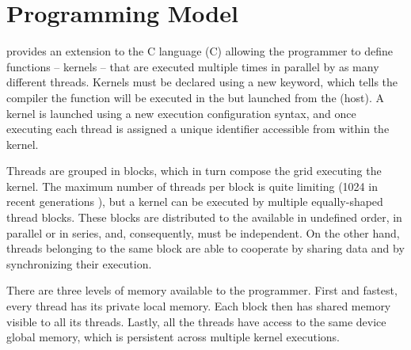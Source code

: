 \documentclass[../thesis]{subfiles}
\begin{document}
	\section{Programming Model}
	\label{sec:cuda:model}
	
	\cuda provides an extension to the C language (\cuda C) allowing the programmer to define functions -- kernels -- that are executed multiple times in parallel by as many different \cuda threads. Kernels must be declared using a new keyword, which tells the compiler the function will be executed in the \gpu but launched from the \cpu (host). A kernel is launched using a new execution configuration syntax, and once executing each thread is assigned a unique identifier accessible from within the kernel.


	Threads are grouped in blocks, which in turn compose the grid executing the kernel. The maximum number of threads per block is quite limiting (1024 in recent generations \cite{NVIDIA:KEPLER}), but a kernel can be executed by multiple equally-shaped thread blocks. These blocks are distributed to the available \sms in undefined order, in parallel or in series, and, consequently, must be independent. On the other hand, threads belonging to the same block are able to cooperate by sharing data and by synchronizing their execution.

	There are three levels of memory available to the programmer. First and fastest, every thread has its private local memory. Each block then has shared memory visible to all its threads. Lastly, all the threads have access to the same device global memory, which is persistent across multiple kernel executions.
\end{document}
